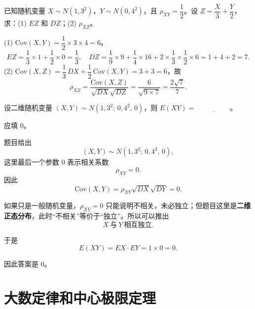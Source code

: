 ﻿\documentclass[lang=cn,11pt]{elegantbook}
\begin{document}
\begin{exercise}\label{exer:4-rho-xz}
已知随机变量 \(X \sim N(1,3^2)\)，\(Y \sim N(0,4^2)\)，且 \(\rho_{XY} = \dfrac{1}{2}\)。设 \(Z = \dfrac{X}{3} + \dfrac{Y}{2}\)，求：(1) \(EZ\) 和 \(DZ\)；(2) \(\rho_{XZ}\)。
\end{exercise}
\begin{solution}
(1) \(\mathrm{Cov}(X,Y) = \dfrac{1}{2} \times 3 \times 4 = 6\)。
\[
EZ = \frac{1}{3} \times 1 + \frac{1}{2} \times 0 = \frac{1}{3},\quad
DZ = \frac{1}{9} \times 9 + \frac{1}{4} \times 16 + 2 \times \frac{1}{3} \times \frac{1}{2} \times 6 = 1 + 4 + 2 = 7.
\]
(2) \(\mathrm{Cov}(X,Z) = \dfrac{1}{3}\,DX + \dfrac{1}{2}\,\mathrm{Cov}(X,Y) = 3 + 3 = 6\)，故
\[
\rho_{XZ} = \frac{\mathrm{Cov}(X,Z)}{\sqrt{DX}\sqrt{DZ}} = \frac{6}{\sqrt{9 \times 7}} = \frac{2\sqrt{7}}{7}.
\]
\end{solution}



\begin{exercise}\label{exer:4-17-bivariate}
设二维随机变量 \((X,Y) \sim N(1, 3^2;\, 0, 4^2,\, 0)\)，则 \(E(XY) =\,\underline{\hspace{2cm}}\)。
\end{exercise}

\begin{solution}
应填 \(0\)。

题目给出
\[
(X,Y)\sim N(1,3^2;\,0,4^2,\,0),
\]
这里最后一个参数 0 表示相关系数
\[
\rho_{XY}=0.
\]
因此
\[
\mathrm{Cov}(X,Y)=\rho_{XY}\sqrt{DX}\sqrt{DY}=0.
\]

如果只是一般随机变量，\(\rho_{XY}=0\) 只能说明不相关，未必独立；但题目这里是\textbf{二维正态分布}，此时“不相关”等价于“独立”。所以可以推出
\[
X\ \text{与}\ Y\ \text{相互独立}.
\]

于是
\[
E(XY) = EX \cdot EY = 1 \times 0 = 0.
\]

因此答案是 \(0\)。
\end{solution}




\chapter{大数定律和中心极限定理}
\end{document}
